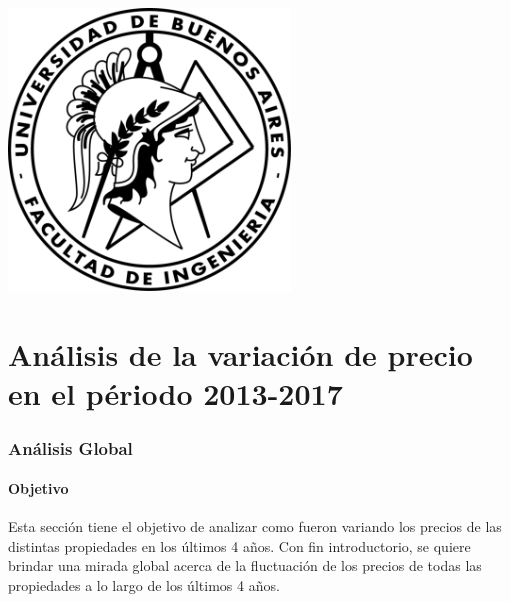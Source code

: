 \documentclass[a4paper, 10pt]{article}
\newcommand\tab[1][0.5cm]{\hspace*{#1}}
\begin{document}
    \newpage

    \begin{center}
        \includegraphics[width=7.5cm, height=7.5cm]{images/logo}
    \end{center}


    \maketitle
    \newpage
    \tableofcontents
    \newpage
	\part{Análisis de la variación de precio en el périodo 2013-2017}

		\section{Análisis Global}

      \subsection{Objetivo}

        \tab Esta sección tiene el objetivo de analizar como fueron variando los precios de las distintas propiedades en los últimos 4 años. Con fin introductorio, se quiere brindar una mirada global acerca de la fluctuación de los precios de todas las propiedades a lo largo de los últimos 4 años.
\end{document}
